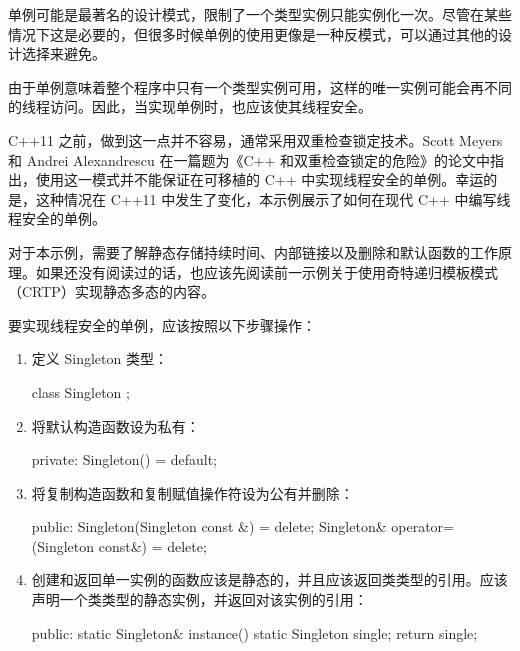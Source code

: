 
单例可能是最著名的设计模式，限制了一个类型实例只能实例化一次。尽管在某些情况下这是必要的，但很多时候单例的使用更像是一种反模式，可以通过其他的设计选择来避免。

由于单例意味着整个程序中只有一个类型实例可用，这样的唯一实例可能会再不同的线程访问。因此，当实现单例时，也应该使其线程安全。

C++11 之前，做到这一点并不容易，通常采用双重检查锁定技术。Scott Meyers 和 Andrei Alexandrescu 在一篇题为《C++ 和双重检查锁定的危险》的论文中指出，使用这一模式并不能保证在可移植的 C++ 中实现线程安全的单例。幸运的是，这种情况在 C++11 中发生了变化，本示例展示了如何在现代 C++ 中编写线程安全的单例。


对于本示例，需要了解静态存储持续时间、内部链接以及删除和默认函数的工作原理。如果还没有阅读过的话，也应该先阅读前一示例关于使用奇特递归模板模式（CRTP）实现静态多态的内容。


要实现线程安全的单例，应该按照以下步骤操作：

\begin{enumerate}
\item
定义 Singleton 类型：

\begin{cpp}
class Singleton
{
};
\end{cpp}

\item
将默认构造函数设为私有：

\begin{cpp}
private:
    Singleton() = default;
\end{cpp}

\item
将复制构造函数和复制赋值操作符设为公有并删除：

\begin{cpp}
public:
    Singleton(Singleton const &) = delete;
    Singleton& operator=(Singleton const&) = delete;
\end{cpp}

\item
创建和返回单一实例的函数应该是静态的，并且应该返回类类型的引用。应该声明一个类类型的静态实例，并返回对该实例的引用：

\begin{cpp}
public:
    static Singleton& instance()
    {
        static Singleton single;
        return single;
    }
\end{cpp}
\end{enumerate}

